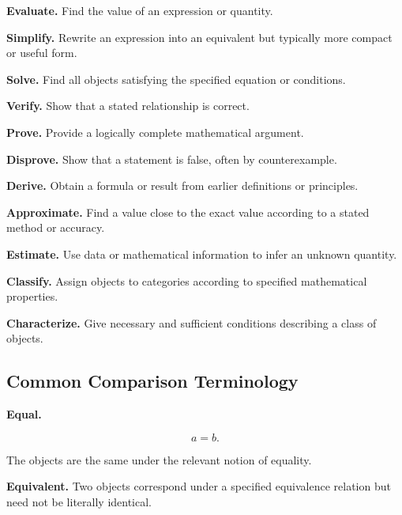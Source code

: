 \textbf{Evaluate.}
Find the value of an expression or quantity.

\medskip

\textbf{Simplify.}
Rewrite an expression into an equivalent but typically more compact or useful
form.

\medskip

\textbf{Solve.}
Find all objects satisfying the specified equation or conditions.

\medskip

\textbf{Verify.}
Show that a stated relationship is correct.

\medskip

\textbf{Prove.}
Provide a logically complete mathematical argument.

\medskip

\textbf{Disprove.}
Show that a statement is false, often by counterexample.

\medskip

\textbf{Derive.}
Obtain a formula or result from earlier definitions or principles.

\medskip

\textbf{Approximate.}
Find a value close to the exact value according to a stated method or
accuracy.

\medskip

\textbf{Estimate.}
Use data or mathematical information to infer an unknown quantity.

\medskip

\textbf{Classify.}
Assign objects to categories according to specified mathematical properties.

\medskip

\textbf{Characterize.}
Give necessary and sufficient conditions describing a class of objects.

\subsection{Common Comparison Terminology}
\label{subsec:comparison-terminology-reference}

\textbf{Equal.}

\[
\boxed{
a=b.
}
\]

The objects are the same under the relevant notion of equality.

\medskip

\textbf{Equivalent.}
Two objects correspond under a specified equivalence relation but need not be
literally identical.

